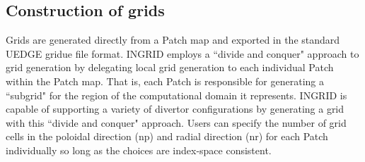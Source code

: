 \subsection{Construction of grids}
Grids are generated directly from a Patch map and exported in the standard UEDGE gridue file format. INGRID employs a ``divide and conquer" approach to grid generation by delegating local grid generation to each individual Patch within the Patch map. That is, each Patch is responsible for generating a ``subgrid" for the region of the computational domain it represents. INGRID is capable of supporting a variety of divertor configurations by generating a grid with this ``divide and conquer" approach. 
Users can specify the number of grid cells in the poloidal direction (np) and radial direction (nr) for each Patch individually so long as the choices are index-space consistent.